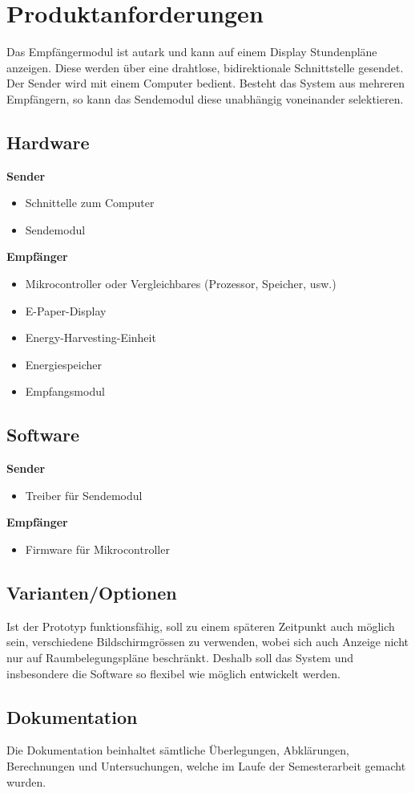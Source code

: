 \section{Produktanforderungen}
\label{sec:funcReqs}
Das Empfängermodul ist autark und kann auf einem Display Stundenpläne anzeigen.
Diese werden über eine drahtlose, bidirektionale Schnittstelle gesendet.
Der Sender wird mit einem Computer bedient.
Besteht das System aus mehreren Empfängern, so kann das Sendemodul diese unabhängig voneinander selektieren.

\subsection{Hardware}
\textbf{Sender}
	\begin{itemize}
		\item Schnittelle zum Computer
		\item Sendemodul
	\end{itemize}

\textbf{Empfänger}
	\begin{itemize}
		\item Mikrocontroller oder Vergleichbares (Prozessor, Speicher, usw.)
		\item E-Paper-Display
		\item Energy-Harvesting-Einheit
		\item Energiespeicher
		\item Empfangsmodul
	\end{itemize}

\subsection{Software}
\textbf{Sender}
\begin{itemize}
	\item Treiber für Sendemodul
\end{itemize}

\textbf{Empfänger}
\begin{itemize}
	\item Firmware für Mikrocontroller
\end{itemize}

\subsection{Varianten/Optionen}
Ist der Prototyp funktionsfähig, soll zu einem späteren Zeitpunkt auch möglich sein, verschiedene Bildschirmgrössen zu verwenden, wobei sich auch Anzeige nicht nur auf Raumbelegungspläne beschränkt.
Deshalb soll das System und insbesondere die Software so flexibel wie möglich entwickelt werden.

\subsection{Dokumentation}
Die Dokumentation beinhaltet sämtliche Überlegungen, Abklärungen, Berechnungen und Untersuchungen, welche im Laufe der Semesterarbeit gemacht wurden.